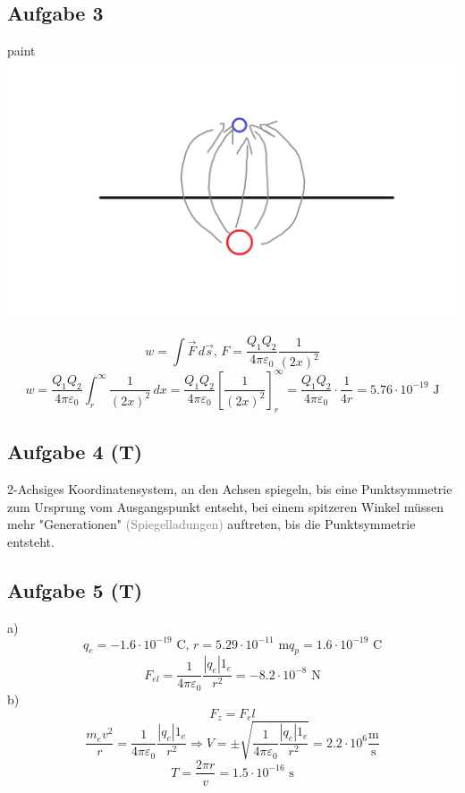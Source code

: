 \documentclass{article}
\begin{document}
\subsection*{Aufgabe 3}
\begin{center}paint
    \includegraphics{Abbildungen/Abb.2.png}
\end{center}
\begin{equation*}
    w = \int \vec{F}\,d\vec{s}, \,F=\frac{Q_1Q_2}{4\pi\varepsilon_0}\frac{1}{(2x)^2}
\end{equation*}
\begin{equation*}
    w = \frac{Q_1Q_2}{4\pi\varepsilon_0} \int_{r}^{\infty} \frac{1}{(2x)^2}\,dx = \frac{Q_1Q_2}{4\pi\varepsilon_0} \left[\frac{1}{(2x)^2}\right]^\infty_r = \frac{Q_1Q_2}{4\pi\varepsilon_0} \cdot \frac{1}{4r} = 5.76 \cdot 10^{-19} \text{ J}
\end{equation*}

\subsection*{Aufgabe 4 (T)}
2-Achsiges Koordinatensystem, an den Achsen spiegeln, bis eine Punktsymmetrie zum Ursprung vom Ausgangspunkt entseht, bei einem spitzeren Winkel müssen mehr "Generationen" \textcolor{gray}{(Spiegelladungen)} auftreten, bis die Punktsymmetrie entsteht.

\subsection*{Aufgabe 5 (T)}
a) \begin{equation*}
    q_e = -1.6 \cdot 10^{-19} \text{ C}, \, r = 5.29\cdot 10^{-11}\text{ m} q_p = 1.6 \cdot 10^{-19} \text{ C}
\end{equation*}
\begin{equation*}
    F_{el} = \frac{1}{4\pi\varepsilon_0}\frac{|q_e|1_e}{r^2} = -8.2 \cdot 10^{-8} \text{ N}
\end{equation*}
b)
\begin{equation*}
    F_z = F_el
\end{equation*}
\begin{equation*}
    \frac{m_ev^2}{r}=\frac{1}{4\pi\varepsilon_0}\frac{|q_e|1_e}{r^2} \Rightarrow V = \pm \sqrt{\frac{1}{4\pi\varepsilon_0}\frac{|q_e|1_e}{r^2}} = 2.2 \cdot 10^6 \mathrm{\frac{m}{s}}
\end{equation*}
\begin{equation*}
    T = \frac{2\pi r}{v}=1.5 \cdot 10^{-16}\text{ s}
\end{equation*}
\end{document}
